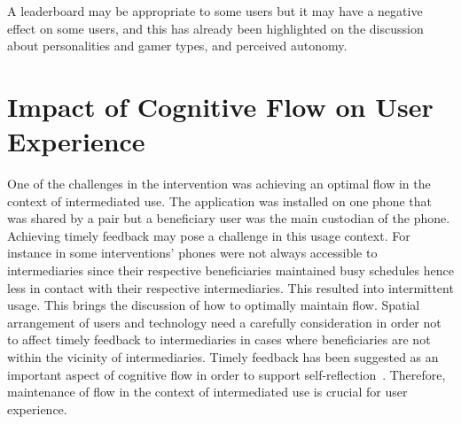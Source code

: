A leaderboard may be appropriate to some users but it may have a negative effect on some users, and this has already been highlighted on the discussion about personalities and gamer types, and perceived autonomy. 

\section{Impact of Cognitive Flow on User Experience}
One of the challenges in the intervention was achieving an optimal flow in the context of intermediated use. The application was installed on one phone that was shared by a pair but a beneficiary user was the main custodian of the phone. Achieving timely feedback may pose a challenge in this usage context. For instance in some interventions' phones were not always accessible  to intermediaries since their respective beneficiaries maintained busy schedules hence less in contact with their respective intermediaries. This resulted into intermittent usage. This brings the discussion of how to optimally maintain flow. Spatial arrangement of users and technology need a carefully consideration in order not to affect timely feedback to intermediaries in cases where beneficiaries are not within the vicinity of intermediaries. Timely feedback  has been suggested as an important aspect of cognitive flow in order to support self-reflection~\citep{csikszentmihalyiflow}. Therefore, maintenance of flow in the context of intermediated use is crucial for user experience. 

